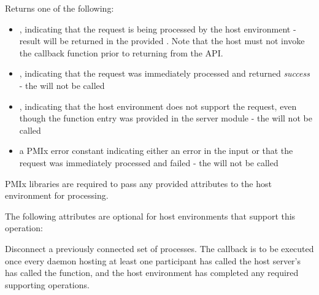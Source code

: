 \begin{arglist}
\end{arglist}

Returns one of the following:

\begin{itemize}
    \item {}, indicating that the request is being processed by the host environment - result will be returned in the provided . Note that the host must not invoke the callback function prior to returning from the \ac{API}.
    \item {}, indicating that the request was immediately processed and returned \textit{success} - the  will not be called
    \item {}, indicating that the host environment does not support the request, even though the function entry was provided in the server module - the  will not be called
    \item a PMIx error constant indicating either an error in the input or that the request was immediately processed and failed - the  will not be called
\end{itemize}

\reqattrstart
\ac{PMIx} libraries are required to pass any provided attributes to the host environment for processing.
\reqattrend

\optattrstart
The following attributes are optional for host environments that support this operation:


\optattrend

\descr

Disconnect a previously connected set of processes. The callback is to be executed once every daemon hosting at least one participant has called the host server's has called the  function, and the host environment has completed any required supporting operations.

